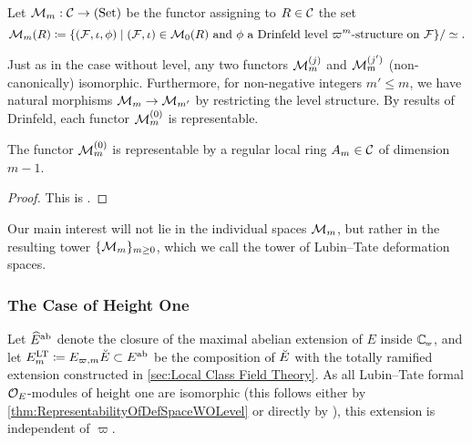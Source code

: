 \documentclass[../main.tex]{subfiles}
\begin{document}
\begin{defi}\label{def:LTDefSpaceWithLevel}
  Let $\mathcal{M}_m: \mathcal{C} \to {(\mathrm{Set})}$ be the functor assigning to $R \in \mathcal{C}$ the set 
  \begin{equation*}
    \mathcal{M}_m(R) \coloneqq \{(\mathcal{F}, \iota, \phi) \mid (\mathcal{F}, \iota) \in \mathcal{M}_0(R) \text{ and }\phi
    \text{ a Drinfeld level $\varpi^m$-structure on $\mathcal{F}$}\}/\simeq.
  \end{equation*}
\end{defi}

Just as in the case without level, any two functors $\mathcal{M}_m^{(j)}$ and
$\mathcal{M}_m^{(j')}$ (non-canonically) isomorphic.
Furthermore, for non-negative integers $m' \leq m$, we have
natural morphisms
$\mathcal{M}_m \to \mathcal{M}_{m'}$ by restricting the level structure. 
By results of Drinfeld, each functor $\mathcal{M}_m^{(0)}$ is representable.

\begin{thm}\label{thm:RepresentabilityOfDefSpaceWithLevel}
  The functor $\mathcal{M}_m^{(0)}$ is representable by a regular local ring $A_m \in \mathcal{C}$ of 
  dimension $m-1$.
\begin{proof}
  This is \cite[Proposition 4.3]{drinfel1974elliptic}.
\end{proof}
\end{thm}

Our main interest will
not lie in the individual spaces $\mathcal{M}_m$, but rather in the resulting tower
$\{\mathcal{M}_m\}_{m \geq 0}$, which we call the tower of Lubin--Tate deformation
spaces.


\subsubsection{The Case of Height One} %
\label{ssub:The Case of Height One}
Let $\widehat E^{\mathrm{ab}}$ denote the closure of the maximal abelian extension of $E$ inside
$\Cp$, and let $E_m^{\mathrm{LT}} \coloneq E_{\varpi, m}{\breve {E}} \subset E^{\mathrm{ab}}$ be the composition
of ${\breve {E}}$ with the totally ramified extension constructed in \cref{sec:Local
Class Field Theory}. As all Lubin--Tate formal $\mathcal{O}_E$-modules of height one
are isomorphic (this follows either by \cref{thm:RepresentabilityOfDefSpaceWOLevel} 
or directly by \cite[Lemma 2]{LubinTateFormalMult}), this extension is independent
of $\varpi$. 
\end{document}
